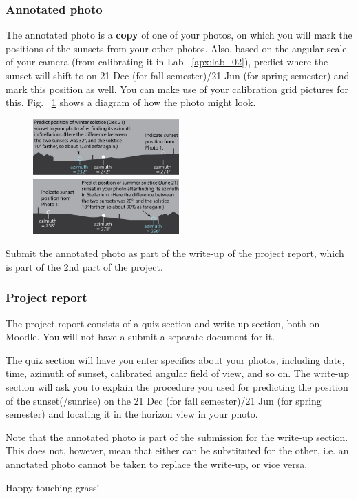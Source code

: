 \documentclass[main.tex]{subfiles}
\begin{document}
\subsubsection{Annotated photo}
The annotated photo is a \textbf{copy} of one of your photos, on which you will mark the positions of the sunsets from your other photos. Also, based on the angular scale of your camera (from calibrating it in Lab ~\ref{apx:lab_02}), predict where the sunset will shift to on 21 Dec (for fall semester)/21 Jun (for spring semester) and mark this position as well. You can make use of your calibration grid pictures for this. Fig. ~\ref{fig:photanot} shows a diagram of how the photo might look.
\begin{figure}[htb]
\begin{center}
\includegraphics[width=0.5\textwidth]{sunset-pictures-fall-diagram.jpg}
\includegraphics[width=0.5\textwidth]{sunset-pictures-spring-diagram.jpg}
\caption{}
\label{fig:photanot}
\end{center}
\end{figure}

Submit the annotated photo as part of the write-up of the project report, which is part of the 2nd part of the project.

\subsubsection{Project report}
The project report consists of a quiz section and write-up section, both on Moodle. You will not have a submit a separate document for it.

The quiz section will have you enter specifics about your photos, including date, time, azimuth of sunset, calibrated angular field of view, and so on. The write-up section will ask you to explain the procedure you used for predicting the position of the sunset(/sunrise) on the 21 Dec (for fall semester)/21 Jun (for spring semester) and locating it in the horizon view in your photo.

Note that the annotated photo is part of the submission for the write-up section. This does not, however, mean that either can be substituted for the other, i.e. an annotated photo cannot be taken to replace the write-up, or vice versa.

Happy touching grass!
\end{document}
